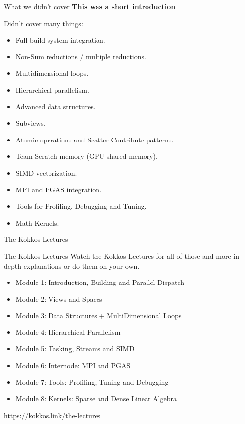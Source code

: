 \begin{frame}[fragile]{What we didn't cover}
	\textbf{This was a short introduction}
	
	Didn't cover many things:
	\begin{itemize}
		\item Full build system integration.
		\item Non-Sum reductions / multiple reductions.
		\item Multidimensional loops.
                \item Hierarchical parallelism.
		\item Advanced data structures.
		\item Subviews.
		\item Atomic operations and Scatter Contribute patterns.
		\item Team Scratch memory (GPU shared memory).
		\item SIMD vectorization.
		\item MPI and PGAS integration.
		\item Tools for Profiling, Debugging and Tuning.
		\item Math Kernels.
	\end{itemize}

\end{frame}

\begin{frame}{The Kokkos Lectures}
        
	\begin{block}{The Kokkos Lectures}
		Watch the Kokkos Lectures for all of those and more in-depth explanations or do them on your own.
	\end{block}

\begin{itemize}
	\item Module 1: Introduction, Building and Parallel Dispatch
	\item Module 2: Views and Spaces
	\item Module 3: Data Structures + MultiDimensional Loops
	\item Module 4: Hierarchical Parallelism
	\item Module 5: Tasking, Streams and SIMD
	\item Module 6: Internode: MPI and PGAS
	\item Module 7: Tools: Profiling, Tuning and Debugging
	\item Module 8: Kernels: Sparse and Dense Linear Algebra
\end{itemize}

\begin{center}
\url{https://kokkos.link/the-lectures}
\end{center}

\end{frame}

